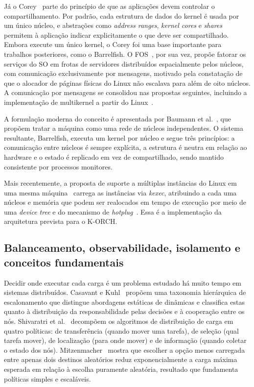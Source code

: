 \documentclass[12pt]{article}
\begin{document}
Já o Corey~\cite{boydwickizer2008corey} parte do princípio de que as aplicações devem controlar o compartilhamento.
Por padrão, cada estrutura de dados do kernel é usada por um único núcleo, e abstrações como \textit{address ranges},
\textit{kernel cores} e \textit{shares} permitem à aplicação indicar explicitamente o que deve ser compartilhado.
Embora execute um único kernel, o Corey foi uma base importante para trabalhos posteriores, como o Barrelfish.
O FOS~\cite{wentzlaff2009fos}, por sua vez, propõe fatorar os serviços do SO em frotas de servidores distribuídos
espacialmente pelos núcleos, com comunicação exclusivamente por mensagens, motivado pela constatação de que o
alocador de páginas físicas do Linux não escalava para além de oito núcleos. A comunicação por mensagens se
consolidou nas propostas seguintes, incluindo a implementação de multikernel a partir do Linux~\cite{wang2025multikernel}.

A formulação moderna do conceito é apresentada por Baumann et al.~\cite{baumann2009multikernel}, que propõem tratar
a máquina como uma rede de núcleos independentes.
O sistema resultante, Barrelfish, executa um kernel por núcleo e
segue três princípios: a comunicação entre núcleos é sempre explícita, a estrutura é neutra em relação ao hardware e
o estado é replicado em vez de compartilhado, sendo mantido consistente por processos monitores.

Mais recentemente, a proposta de suporte a múltiplas instâncias do Linux em uma mesma máquina~\cite{wang2025multikernel}
carrega as instâncias via \textit{kexec}, atribuindo a cada uma núcleos e memória que podem ser realocados em tempo de
execução por meio de uma \textit{device tree} e do mecanismo de \textit{hotplug}~\cite{wang2025lpc}.
Essa é a implementação da arquitetura prevista para o K-ORCH.

\subsection{Balanceamento, observabilidade, isolamento e conceitos fundamentais}
\label{sec:rel-fundamentos}

Decidir onde executar cada carga é um problema estudado há muito tempo em sistemas distribuídos.
Casavant e Kuhl~\cite{casavant1988taxonomy} propõem uma taxonomia hierárquica de escalonamento que distingue
abordagens estáticas de dinâmicas e classifica estas quanto à distribuição da responsabilidade pelas decisões e à
cooperação entre os nós.
Shivaratri et al.~\cite{shivaratri1992load} decompõem os algoritmos de distribuição de carga
em quatro políticas: de transferência (quando mover uma tarefa), de seleção (qual tarefa mover), de localização
(para onde mover) e de informação (quando coletar o estado dos nós).
Mitzenmacher~\cite{mitzenmacher2001power}
mostra que escolher a opção menos carregada entre apenas dois destinos aleatórios reduz exponencialmente a carga
máxima esperada em relação à escolha puramente aleatória, resultado que fundamenta políticas simples e escaláveis.
\end{document}
